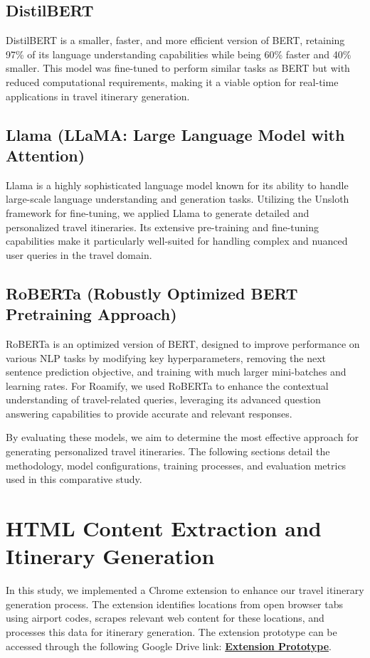 \documentclass[conference]{IEEEtran}
\begin{document}
    \subsection{DistilBERT}
        DistilBERT is a smaller, faster, and more efficient version of BERT, retaining 97\% of its language understanding capabilities while being 60\% faster and 40\% smaller. This model was fine-tuned to perform similar tasks as BERT but with reduced computational requirements, making it a viable option for real-time applications in travel itinerary generation.

    \subsection{Llama (LLaMA: Large Language Model with Attention)}
        Llama is a highly sophisticated language model known for its ability to handle large-scale language understanding and generation tasks. Utilizing the Unsloth framework for fine-tuning, we applied Llama to generate detailed and personalized travel itineraries. Its extensive pre-training and fine-tuning capabilities make it particularly well-suited for handling complex and nuanced user queries in the travel domain.

    \subsection{RoBERTa (Robustly Optimized BERT Pretraining Approach)}
        RoBERTa is an optimized version of BERT, designed to improve performance on various NLP tasks by modifying key hyperparameters, removing the next sentence prediction objective, and training with much larger mini-batches and learning rates. For Roamify, we used RoBERTa to enhance the contextual understanding of travel-related queries, leveraging its advanced question answering capabilities to provide accurate and relevant responses.

    By evaluating these models, we aim to determine the most effective approach for generating personalized travel itineraries. The following sections detail the methodology, model configurations, training processes, and evaluation metrics used in this comparative study.

\section{HTML Content Extraction and Itinerary Generation}

    In this study, we implemented a Chrome extension to enhance our travel itinerary generation process. The extension identifies locations from open browser tabs using airport codes, scrapes relevant web content for these locations, and processes this data for itinerary generation.
    The extension prototype can be accessed through the following Google Drive link: \href{https://drive.google.com/file/d/1qkj995W8CXmMslBy-55xUxxnHPPIOsoV/view?usp=sharing}{\textbf{Extension Prototype}}.
\end{document}
